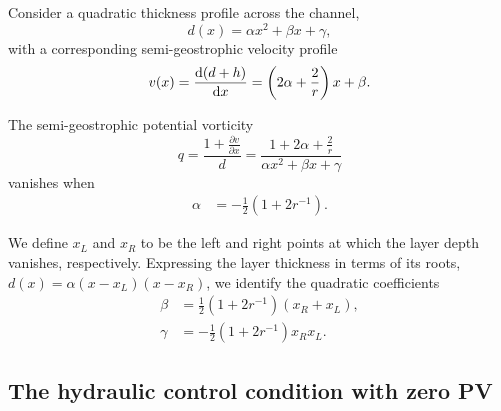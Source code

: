 \documentclass{jfm}
\begin{document}
Consider a quadratic thickness profile across the channel,
\begin{equation}\label{eq.thickness}
d(x) = \alpha x^{2} + \beta x + \gamma,
\end{equation}
with a corresponding semi-geostrophic velocity profile
\begin{equation}\label{eq.velocity}
v(x) = \dv{(d+h)}{x} = \left(2 \alpha + \frac{2}{r} \right) x + \beta.
\end{equation}

The semi-geostrophic potential vorticity 
\begin{equation}
q = \frac{1+\frac{\partial v}{\partial x}}{d} = \frac{1+2\alpha + \frac{2}{r}}{\alpha x^{2} + \beta x + \gamma}
\end{equation}
vanishes when 
\begin{align}
\alpha &= -\frac{1}{2}(1+2r^{-1}).
\end{align}

We define $x_{L}$ and $x_{R}$ to be the left and right points at which the layer depth vanishes, respectively. Expressing the layer thickness in terms of its roots, $d(x) = \alpha (x-x_{L})(x-x_{R})$, we identify the quadratic coefficients
\begin{align}
\beta &= \frac{1}{2}(1+2r^{-1})(x_{R}+x_{L}), \\
\gamma &= -\frac{1}{2}(1+2r^{-1})x_{R}x_{L}.
\end{align}

\subsection{The hydraulic control condition with zero PV}
\end{document}
